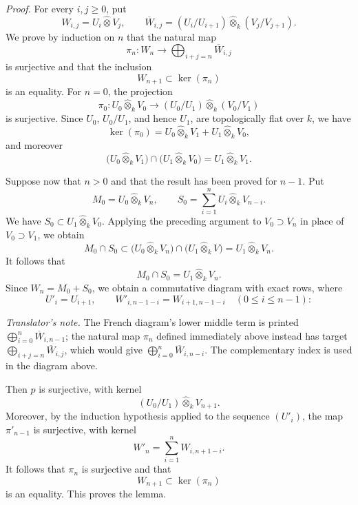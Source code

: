 
\noindent\textit{Proof.}
For every \(i,j\geq0\), put
\[
  W_{i,j}=U_i\widehat\otimes V_j,
  \qquad
  \overline W_{i,j}
  =
  (U_i/U_{i+1})\widehat\otimes_k(V_j/V_{j+1}).
\]
We prove by induction on \(n\) that the natural map
\[
  \pi_n:W_n\longrightarrow
  \bigoplus_{i+j=n}\overline W_{i,j}
\]
is surjective and that the inclusion
\[
  W_{n+1}\subset\ker(\pi_n)
\]
is an equality. For \(n=0\), the projection
\[
  \pi_0:
  U_0\widehat\otimes_kV_0
  \longrightarrow
  (U_0/U_1)\widehat\otimes_k(V_0/V_1)
\]
is surjective. Since \(U_0\), \(U_0/U_1\), and hence \(U_1\),
are topologically flat over \(k\), we have
\[
  \ker(\pi_0)
  =
  U_0\widehat\otimes_kV_1
  +
  U_1\widehat\otimes_kV_0,
\]
and moreover
\[
  \bigl(U_0\widehat\otimes_kV_1\bigr)
  \cap
  \bigl(U_1\widehat\otimes_kV_0\bigr)
  =
  U_1\widehat\otimes_kV_1.
\]

Suppose now that \(n>0\) and that the result has been proved for
\(n-1\). Put
\[
  M_0=U_0\widehat\otimes_kV_n,
  \qquad
  S_0=\sum_{i=1}^{n}U_i\widehat\otimes_kV_{n-i}.
\]
We have \(S_0\subset U_1\widehat\otimes_kV_0\). Applying the
preceding argument to \(V_0\supset V_n\) in place of
\(V_0\supset V_1\), we obtain
\[
  M_0\cap S_0
  \subset
  \bigl(U_0\widehat\otimes_kV_n\bigr)
  \cap
  \bigl(U_1\widehat\otimes_kV\bigr)
  =
  U_1\widehat\otimes_kV_n.
\]
It follows that
\[
  M_0\cap S_0=U_1\widehat\otimes_kV_n.
\]
Since \(W_n=M_0+S_0\), we obtain a commutative diagram with exact
rows, where
\[
  U'_i=U_{i+1},
  \qquad
  W'_{i,n-1-i}=W_{i+1,n-1-i}
  \quad(0\leq i\leq n-1):
\]
\begin{center}
  \label{sga3:VIIB:5.1.2:filtration-exact-rows-diagram}
  
\end{center}

\label{sga3:VIIB:5.1.2:diagram-source-notation-note}
\noindent\textit{Translator's note.}\enspace
The French diagram's lower middle term is printed
\(\bigoplus_{i=0}^{n}\overline W_{i,n-1}\); the natural map
\(\pi_n\) defined immediately above instead has target
\(\bigoplus_{i+j=n}\overline W_{i,j}\), which would give
\(\bigoplus_{i=0}^{n}\overline W_{i,n-i}\). The complementary index is used in the diagram above.

Then \(p\) is surjective, with kernel
\[
  (U_0/U_1)\widehat\otimes_kV_{n+1}.
\]
Moreover, by the induction hypothesis applied to the sequence
\((U'_i)\), the map \(\pi'_{n-1}\) is surjective, with kernel
\[
  W'_n
  =
  \sum_{i=1}^{n}W_{i,n+1-i}.
\]
It follows that \(\pi_n\) is surjective and that
\[
  W_{n+1}\subset\ker(\pi_n)
\]
is an equality. This proves the lemma.

